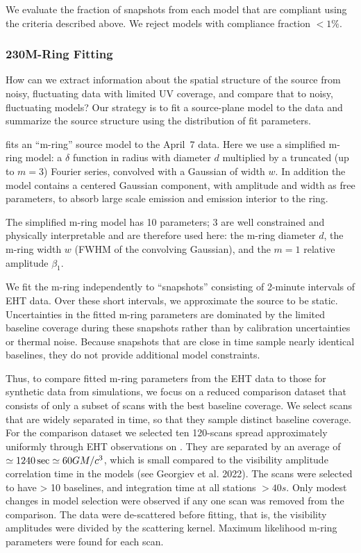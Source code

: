 We evaluate the fraction of snapshots from each model that are compliant using the criteria described above.  We reject models with compliance fraction $< 1\%$.

\subsubsection{230\GHz M-Ring Fitting}

How can we extract information about the spatial structure of the source from noisy, fluctuating data with limited UV coverage, and compare that to noisy, fluctuating models?
Our strategy is to fit a source-plane model to the data and summarize the source structure using the distribution of fit parameters.

 fits an ``m-ring'' source model to the April~7 data.  Here we use a simplified m-ring model: a $\delta$ function in radius with diameter $d$ multiplied by a truncated (up to $m = 3$) Fourier series, convolved with a Gaussian of width $w$.  In addition the model contains a centered Gaussian component, with amplitude and width as free parameters, to absorb large scale emission and emission interior to the ring.

The simplified m-ring model has 10 parameters; 3 are well constrained and physically interpretable and are therefore used here: the m-ring diameter $d$, the m-ring width $w$ (FWHM of the convolving  Gaussian), and the $m=1$ relative amplitude $\beta_1$.

We fit the m-ring independently to ``snapshots'' consisting of 2-minute intervals of EHT data. Over these short intervals, we approximate the source to be static.  Uncertainties in the fitted m-ring parameters are dominated by the limited baseline coverage during these snapshots rather than by calibration uncertainties or thermal noise. Because snapshots that are close in time sample nearly identical baselines, they do not provide additional model constraints.

Thus, to compare fitted m-ring parameters from the EHT data to those for synthetic data from simulations, we focus on a reduced comparison dataset that consists of only a subset of scans with the best baseline coverage. We select scans that are widely separated in time, so that they sample distinct baseline coverage. For the comparison dataset we selected ten 120-\sec scans spread approximately uniformly through EHT observations on \aprilvii.  They are separated by an average of $\simeq 1240\,\mathrm{sec} \simeq 60 GM/c^3$, which is small compared to the visibility amplitude correlation time in the models (see Georgiev et al. 2022). The scans were selected to have > 10 baselines, and integration time at all stations $> 40s$.    Only modest changes in model selection were observed if any one scan was removed from the comparison.  The data were de-scattered before fitting, that is, the visibility amplitudes were divided by the scattering kernel.  Maximum likelihood m-ring parameters were found for each scan.

